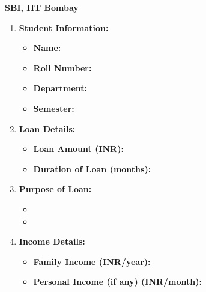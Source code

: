 \documentclass{article}
\begin{document}
\begin{Form}
\textbf{SBI, IIT Bombay}\\

\begin{enumerate}[label=\textbf{\arabic*.}, leftmargin=*]
    \item \textbf{Student Information:}
    \begin{itemize}[label={}, leftmargin=*]
        \item \textbf{Name:} \TextField{}
        \item \textbf{Roll Number:} \TextField{}
        \item \textbf{Department:} \TextField{}
        \item \textbf{Semester:} \TextField{}
    \end{itemize}
    
    \item \textbf{Loan Details:}
    \begin{itemize}[label={}, leftmargin=*]
        \item \textbf{Loan Amount (INR):} \TextField{}
        \item \textbf{Duration of Loan (months):} \TextField{}
    \end{itemize}
    
    \item \textbf{Purpose of Loan:}
    \begin{itemize}[label={}, leftmargin=*, itemsep=0pt]
        \item {} \hspace{1em}
         \hspace{1em}
          \hspace{1em}
        \item {} \hspace{1em}
          \hspace{1em}
    \end{itemize}
    
    \item \textbf{Income Details:}
    \begin{itemize}[label={}, leftmargin=*]
        \item \textbf{Family Income (INR/year):} \TextField{}
        \item \textbf{Personal Income (if any) (INR/month):} \TextField{}
    \end{itemize}
    

\end{enumerate}
\end{Form}
\end{document}
